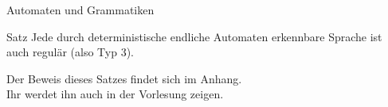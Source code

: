 \begin{frame}{Automaten und Grammatiken}
  \begin{exampleblock}{Satz}
    Jede durch deterministische endliche Automaten erkennbare Sprache ist auch regulär (also Typ 3).
  \end{exampleblock}
  Der Beweis dieses Satzes findet sich im Anhang.\\
  Ihr werdet ihn auch in der Vorlesung zeigen.
\end{frame}
